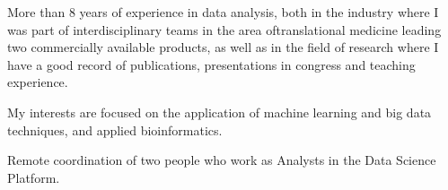 \documentclass[10pt,a4paper,ragged2e]{altacv}
\begin{document}

\begin{fullwidth}
\makecvheader
\end{fullwidth}




More than 8 years of experience in data analysis, both in the industry where I was part of interdisciplinary teams in the area of ​​translational medicine leading two commercially available products, as well as in the field of research where I have a good record of publications, presentations in congress and teaching experience.

My interests are focused on the application of machine learning and big data techniques, and applied bioinformatics.

\medskip


Remote coordination of two people who work as Analysts in the Data Science Platform.

\divider
\end{document}
